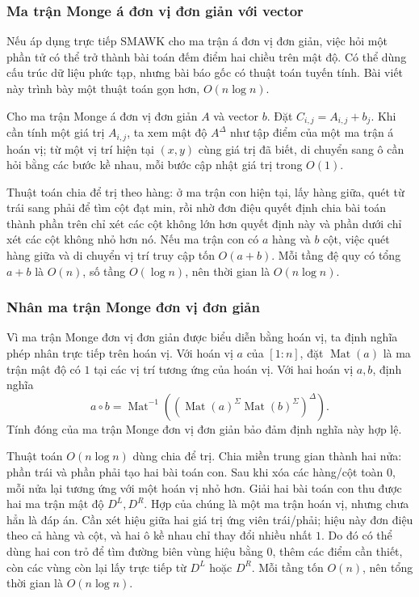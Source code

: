\documentclass[11pt]{article}
\begin{document}
\subsubsection{Ma trận Monge á đơn vị đơn giản với vector}

Nếu áp dụng trực tiếp SMAWK cho ma trận á đơn vị đơn giản, việc hỏi một phần tử
có thể trở thành bài toán đếm điểm hai chiều trên mật độ. Có thể dùng cấu trúc
dữ liệu phức tạp, nhưng bài báo gốc có thuật toán tuyến tính. Bài viết này
trình bày một thuật toán gọn hơn, $O(n\log n)$.

Cho ma trận Monge á đơn vị đơn giản $A$ và vector $b$. Đặt
$C_{i,j}=A_{i,j}+b_j$. Khi cần tính một giá trị $A_{i,j}$, ta xem mật độ
$A^{\Delta}$ như tập điểm của một ma trận á hoán vị; từ một vị trí hiện tại
$(x,y)$ cùng giá trị đã biết, di chuyển sang ô cần hỏi bằng các bước kề nhau,
mỗi bước cập nhật giá trị trong $O(1)$.

Thuật toán chia để trị theo hàng: ở ma trận con hiện tại, lấy hàng giữa, quét
từ trái sang phải để tìm cột đạt min, rồi nhờ đơn điệu quyết định chia bài toán
thành phần trên chỉ xét các cột không lớn hơn quyết định này và phần dưới chỉ
xét các cột không nhỏ hơn nó. Nếu ma trận con có $a$ hàng và $b$ cột, việc
quét hàng giữa và di chuyển vị trí truy cập tốn $O(a+b)$. Mỗi tầng đệ quy có
tổng $a+b$ là $O(n)$, số tầng $O(\log n)$, nên thời gian là $O(n\log n)$.

\subsubsection{Nhân ma trận Monge đơn vị đơn giản}

Vì ma trận Monge đơn vị đơn giản được biểu diễn bằng hoán vị, ta định nghĩa
phép nhân trực tiếp trên hoán vị. Với hoán vị $a$ của $[1:n]$, đặt
$\operatorname{Mat}(a)$ là ma trận mật độ có $1$ tại các vị trí tương ứng của
hoán vị. Với hai hoán vị $a,b$, định nghĩa
\[
  a\circ b
  =
  \operatorname{Mat}^{-1}\!\left(
    \left(\operatorname{Mat}(a)^\Sigma
    \operatorname{Mat}(b)^\Sigma\right)^{\Delta}
  \right).
\]
Tính đóng của ma trận Monge đơn vị đơn giản bảo đảm định nghĩa này hợp lệ.

Thuật toán $O(n\log n)$ dùng chia để trị. Chia miền trung gian thành hai nửa:
phần trái và phần phải tạo hai bài toán con. Sau khi xóa các hàng/cột toàn
$0$, mỗi nửa lại tương ứng với một hoán vị nhỏ hơn. Giải hai bài toán con thu
được hai ma trận mật độ $D^L,D^R$. Hợp của chúng là một ma trận hoán vị, nhưng
chưa hẳn là đáp án. Cần xét hiệu giữa hai giá trị ứng viên trái/phải; hiệu này
đơn điệu theo cả hàng và cột, và hai ô kề nhau chỉ thay đổi nhiều nhất $1$.
Do đó có thể dùng hai con trỏ để tìm đường biên vùng hiệu bằng $0$, thêm các
điểm cần thiết, còn các vùng còn lại lấy trực tiếp từ $D^L$ hoặc $D^R$. Mỗi
tầng tốn $O(n)$, nên tổng thời gian là $O(n\log n)$.
\end{document}
